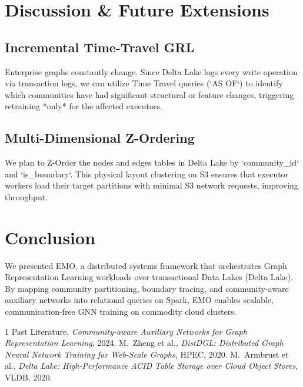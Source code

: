 \documentclass[conference,compsoc]{IEEEtran}
\begin{document}
\section{Discussion \& Future Extensions}
\subsection{Incremental Time-Travel GRL}
Enterprise graphs constantly change. Since Delta Lake logs every write operation via transaction logs, we can utilize Time Travel queries (`AS OF`) to identify which communities have had significant structural or feature changes, triggering retraining *only* for the affected executors.

\subsection{Multi-Dimensional Z-Ordering}
We plan to Z-Order the nodes and edges tables in Delta Lake by `community_id` and `is_boundary`. This physical layout clustering on S3 ensures that executor workers load their target partitions with minimal S3 network requests, improving throughput.

\section{Conclusion}
We presented EMO, a distributed systems framework that orchestrates Graph Representation Learning workloads over transactional Data Lakes (Delta Lake). By mapping community partitioning, boundary tracing, and community-aware auxiliary networks into relational queries on Spark, EMO enables scalable, communication-free GNN training on commodity cloud clusters.

\begin{thebibliography}{1}
Past Literature, \emph{Community-aware Auxiliary Networks for Graph Representation Learning}, 2024.
M.~Zheng et al., \emph{DistDGL: Distributed Graph Neural Network Training for Web-Scale Graphs}, HPEC, 2020.
M.~Armbrust et al., \emph{Delta Lake: High-Performance ACID Table Storage over Cloud Object Stores}, VLDB, 2020.
\end{thebibliography}
\end{document}

